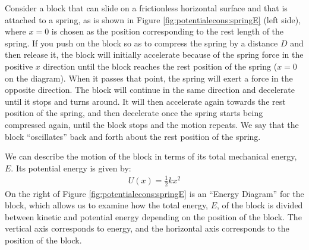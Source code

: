 Consider a block that can slide on a frictionless horizontal surface and that is attached to a spring, as is shown in Figure \ref{fig:potentialecons:springE} (left side), where $x=0$ is chosen as the position corresponding to the rest length of the spring. If you push on the block so as to compress the spring by a distance $D$ and then release it, the block will initially accelerate because of the spring force in the positive $x$ direction until the block reaches the rest position of the spring ($x=0$ on the diagram). When it passes that point, the spring will exert a force in the opposite direction. The block will continue in the same direction and decelerate until it stops and turns around. It will then accelerate again towards the rest position of the spring, and then decelerate once the spring starts being compressed again, until the block stops and the motion repeats. We say that the block ``oscillates'' back and forth about the rest position of the spring.

We can describe the motion of the block in terms of its total mechanical energy, $E$. Its potential energy is given by:
\begin{align*}
U(x)=\frac{1}{2}kx^2
\end{align*}
On the right of Figure \ref{fig:potentialecons:springE} is an ``Energy Diagram'' for the block, which allows us to examine how the total energy, $E$, of the block is divided between kinetic and potential energy depending on the position of the block. The vertical axis corresponds to energy, and the horizontal axis corresponds to the position of the block. 


